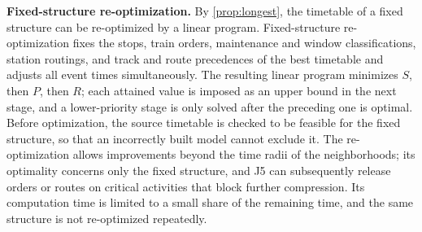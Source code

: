 \textbf{Fixed-structure re-optimization.} By \cref{prop:longest}, the timetable of a fixed structure can be re-optimized by a linear program. Fixed-structure re-optimization fixes the stops, train orders, maintenance and window classifications, station routings, and track and route precedences of the best timetable and adjusts all event times simultaneously. The resulting linear program minimizes $S$, then $P$, then $R$; each attained value is imposed as an upper bound in the next stage, and a lower-priority stage is only solved after the preceding one is optimal. Before optimization, the source timetable is checked to be feasible for the fixed structure, so that an incorrectly built model cannot exclude it. The re-optimization allows improvements beyond the time radii of the neighborhoods; its optimality concerns only the fixed structure, and J5 can subsequently release orders or routes on critical activities that block further compression. Its computation time is limited to a small share of the remaining time, and the same structure is not re-optimized repeatedly.
